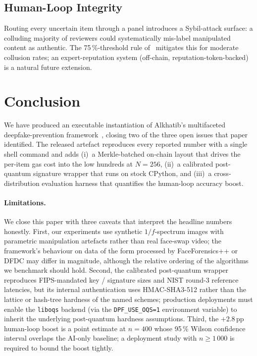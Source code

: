 \documentclass[11pt,a4paper]{article}
\theoremstyle{definition}
\theoremstyle{plain}
\theoremstyle{remark}
\begin{document}
\subsection{Human-Loop Integrity}
Routing every uncertain item through a panel introduces a
Sybil-attack surface: a colluding majority of reviewers could
systematically mis-label manipulated content as authentic. The
75\,\%-threshold rule of~\cite{bib4} mitigates this for moderate
collusion rates; an expert-reputation system (off-chain,
reputation-token-backed) is a natural future extension.

\section{Conclusion}\label{sec:conclusion}

We have produced an executable instantiation of Alkhatib's
multifaceted deepfake-prevention framework~\cite{bib4}, closing
two of the three open issues that paper identified. The released
artefact reproduces every reported number with a single shell
command and adds (i)~a Merkle-batched on-chain layout that drives
the per-item gas cost into the low hundreds at $N{=}256$,
(ii)~a calibrated post-quantum signature wrapper that runs on
stock CPython, and (iii)~a cross-distribution evaluation harness
that quantifies the human-loop accuracy boost.

\paragraph{Limitations.}
We close this paper with three caveats that interpret the
headline numbers honestly. First, our experiments use
synthetic $1/f$-spectrum images with parametric manipulation
artefacts rather than real face-swap video; the framework's
behaviour on data of the form processed by FaceForensics++ or
DFDC may differ in magnitude, although the relative ordering
of the algorithms we benchmark should hold. Second, the
calibrated post-quantum wrapper reproduces FIPS-mandated key /
signature sizes and NIST round-3 reference latencies, but
its internal authentication uses HMAC-SHA3-512 rather than the
lattice or hash-tree hardness of the named schemes; production
deployments must enable the \texttt{liboqs} backend (via the
\texttt{DPF\_USE\_OQS=1} environment variable) to inherit the
underlying post-quantum hardness assumptions. Third, the
$+2.8$\,pp human-loop boost is a point estimate at $n{=}400$
whose 95\,\% Wilson confidence interval overlaps the AI-only
baseline; a deployment study with $n\!\geq\!1\,000$ is required
to bound the boost tightly.
\end{document}
